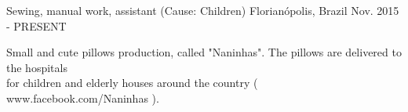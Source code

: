 

\begin{cventries}

  \cventry
    {Sewing, manual work, assistant (Cause: Children)} %
    {} %
    {Florianópolis, Brazil} %
    {Nov. 2015 - PRESENT} %
    {
      \begin{cvitems} %
        \item {Small and cute pillows production, called "Naninhas". The pillows are delivered to the hospitals \\
	for children and elderly houses around the country ( www.facebook.com/Naninhas ).}
      \end{cvitems}
    }

\end{cventries}

